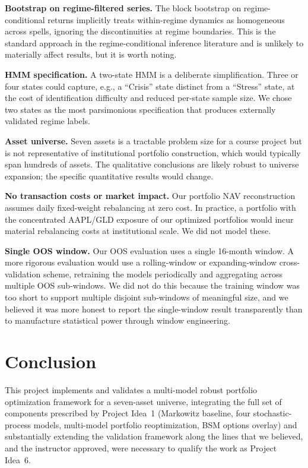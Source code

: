 \documentclass[11pt,letterpaper]{article}
\begin{document}
\textbf{Bootstrap on regime-filtered series.} The block bootstrap on regime-conditional returns implicitly treats within-regime dynamics as homogeneous across spells, ignoring the discontinuities at regime boundaries. This is the standard approach in the regime-conditional inference literature and is unlikely to materially affect results, but it is worth noting.

\textbf{HMM specification.} A two-state HMM is a deliberate simplification. Three or four states could capture, e.g., a ``Crisis'' state distinct from a ``Stress'' state, at the cost of identification difficulty and reduced per-state sample size. We chose two states as the most parsimonious specification that produces externally validated regime labels.

\textbf{Asset universe.} Seven assets is a tractable problem size for a course project but is not representative of institutional portfolio construction, which would typically span hundreds of assets. The qualitative conclusions are likely robust to universe expansion; the specific quantitative results would change.

\textbf{No transaction costs or market impact.} Our portfolio NAV reconstruction assumes daily fixed-weight rebalancing at zero cost. In practice, a portfolio with the concentrated AAPL/GLD exposure of our optimized portfolios would incur material rebalancing costs at institutional scale. We did not model these.

\textbf{Single OOS window.} Our OOS evaluation uses a single 16-month window. A more rigorous evaluation would use a rolling-window or expanding-window cross-validation scheme, retraining the models periodically and aggregating across multiple OOS sub-windows. We did not do this because the training window was too short to support multiple disjoint sub-windows of meaningful size, and we believed it was more honest to report the single-window result transparently than to manufacture statistical power through window engineering.

\section{Conclusion}

This project implements and validates a multi-model robust portfolio optimization framework for a seven-asset universe, integrating the full set of components prescribed by Project Idea~1 (Markowitz baseline, four stochastic-process models, multi-model portfolio reoptimization, BSM options overlay) and substantially extending the validation framework along the lines that we believed, and the instructor approved, were necessary to qualify the work as Project Idea~6.
\end{document}
